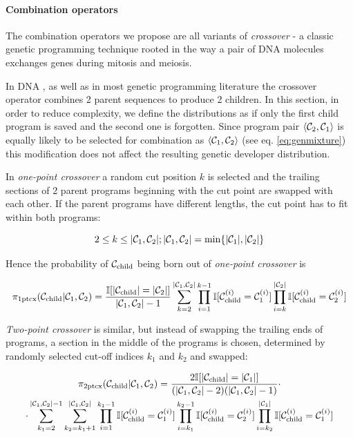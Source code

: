 \paragraph{Combination operators}

The combination operators we propose are all variants of \emph{crossover} - a classic genetic programming technique rooted in the way a pair of DNA molecules exchanges genes during mitosis and meiosis.

In DNA \cite{evocritique}, as well as in most genetic programming literature \cite{genprog1,genprog2} the crossover operator combines 2 parent sequences to produce 2 children.
In this section, in order to reduce complexity, we define the distributions as if only the first child program is saved and the second one is forgotten.
Since program pair $\langle \mathcal{C}_2, \mathcal{C}_1 \rangle$ is equally likely to be selected for combination as $\langle \mathcal{C}_1, \mathcal{C}_2 \rangle$ (see eq. \ref{eq:genmixture}) this modification does not affect the resulting genetic developer distribution.

In \emph{one-point crossover} a random cut position $k$ is selected and the trailing sections of 2 parent programs beginning with the cut point are swapped with each other. 
If the parent programs have different lengths, the cut point has to fit within both programs:

\begin{equation}
    2 \leq k \leq |\mathcal{C}_1,\mathcal{C}_2|; |\mathcal{C}_1,\mathcal{C}_2| = \min\{|\mathcal{C}_1|, |\mathcal{C}_2|\}
\end{equation}

Hence the probability of $\mathcal{C}_\text{child}$ being born out of \emph{one-point crossover} is

\begin{equation}
    \pi_\text{1ptcx}(\mathcal{C}_\text{child}|\mathcal{C}_1,\mathcal{C}_2) =
        \frac{\mathbb{I}[|\mathcal{C}_\text{child}|=|\mathcal{C}_2|]}{|\mathcal{C}_1,\mathcal{C}_2|-1}
        \sum\limits_{k=2}^{|\mathcal{C}_1,\mathcal{C}_2|} \prod\limits_{i=1}^{k-1} \mathbb{I}[\mathcal{C}_\text{child}^{(i)} = \mathcal{C}_1^{(i)}] \prod\limits_{i=k}^{|\mathcal{C}_2|} \mathbb{I}[\mathcal{C}_\text{child}^{(i)} = \mathcal{C}_2^{(i)}]
\end{equation}

\emph{Two-point crossover} is similar, but instead of swapping the trailing ends of programs, a section in the middle of the programs is chosen, determined by randomly selected cut-off indices $k_1$ and $k_2$ and swapped:

\begin{multline}
    \pi_\text{2ptcx}(\mathcal{C}_\text{child}|\mathcal{C}_1,\mathcal{C}_2) =
        \frac{2 \mathbb{I}[|\mathcal{C}_\text{child}|=|\mathcal{C}_1|]}{(|\mathcal{C}_1,\mathcal{C}_2|-2)(|\mathcal{C}_1,\mathcal{C}_2|-1)} 
        \cdot \\ \cdot
        \sum\limits_{k_1=2}^{|\mathcal{C}_1,\mathcal{C}_2|-1}
        \sum\limits_{k_2=k_1+1}^{|\mathcal{C}_1,\mathcal{C}_2|} 
        \prod\limits_{i=1}^{k_1-1} \mathbb{I}[\mathcal{C}_\text{child}^{(i)} = \mathcal{C}_1^{(i)}] \prod\limits_{i=k_1}^{k_2-1} \mathbb{I}[\mathcal{C}_\text{child}^{(i)} = \mathcal{C}_2^{(i)}]
        \prod\limits_{i=k_2}^{|\mathcal{C}_1|} \mathbb{I}[\mathcal{C}_\text{child}^{(i)} = \mathcal{C}_1^{(i)}]
\end{multline}

